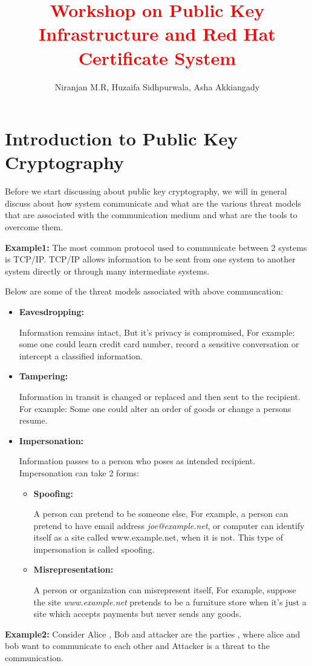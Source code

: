 \documentclass[a4paper]{article}
\title{\textcolor{red}{Workshop on Public Key Infrastructure and Red Hat Certificate System}}
\author{Niranjan M.R, Huzaifa Sidhpurwala, Asha Akkiangady}
\date{}
\begin{document}
\maketitle
\tableofcontents
\section{Introduction to Public Key Cryptography}
Before we start discussing about public key cryptography, we will in general discuss about how system communicate
and what are the various threat models that are associated with the communication medium and what are the tools to 
overcome them.

\textbf{Example1:}
The most common protocol used to communicate between 2 systems is TCP/IP. TCP/IP allows information to be sent 
from one system to another system directly or through many intermediate systems.

Below are some of the threat models associated with above communcation:
\begin{itemize}
    \item \textbf{Eavesdropping:}
        
        Information remains intact, But it's privacy is compromised, For example: some one could learn credit card number, record a sensitive conversation or intercept a
        classified information.
    \item \textbf{Tampering:}

        Information in transit is changed or replaced and then sent to the recipient. For example: Some one could alter an order of goods or change a persons resume.
    \item \textbf{Impersonation:}

        Information passes to a person who poses as intended recipient. Impersonation can take 2 forms:
    \begin{itemize}
        \item \textbf{Spoofing:}

            A person can pretend to be someone else, For example, a person can pretend to have email address \textit{joe@example.net}, 
            or computer can identify itself as a site called www.example.net, when it is not. This type of impersonation is called spoofing.
        \item \textbf{Misrepresentation:}

            A person or organization can misrepresent itself, For example, suppose the site \textit{www.example.net} pretends to be a 
            furniture store when it's just a site which accepts payments but never sends any goods.
    \end{itemize}
\end{itemize}
\textbf{Example2:}
Consider Alice , Bob and attacker are the parties , where alice and bob want to communicate to each other and Attacker is a threat to the communication.
\end{document}
